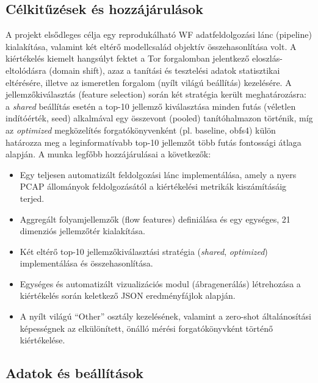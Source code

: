 \documentclass[a4paper,oneside]{article}
\begin{document}
\subsection{Célkitűzések és hozzájárulások}
A projekt elsődleges célja egy reprodukálható WF adatfeldolgozási lánc (pipeline) kialakítása, valamint két eltérő modellcsalád objektív összehasonlítása volt.
A kiértékelés kiemelt hangsúlyt fektet a Tor forgalomban jelentkező eloszlás-eltolódásra (domain shift), azaz a tanítási és tesztelési adatok statisztikai eltérésére, illetve az ismeretlen forgalom (nyílt világú beállítás) kezelésére.
A jellemzőkiválasztás (feature selection) során két stratégia került meghatározásra: a \textit{shared} beállítás esetén a top-10 jellemző kiválasztása minden futás (véletlen indítóérték, seed) alkalmával egy összevont (pooled) tanítóhalmazon történik, míg az \textit{optimized} megközelítés forgatókönyvenként (pl. baseline, obfs4) külön határozza meg a leginformatívabb top-10 jellemzőt több futás fontossági átlaga alapján.
A munka legfőbb hozzájárulásai a következők:
\begin{itemize}
    \item Egy teljesen automatizált feldolgozási lánc implementálása, amely a nyers PCAP állományok feldolgozásától a kiértékelési metrikák kiszámításáig terjed.
\item Aggregált folyamjellemzők (flow features) definiálása és egy egységes, 21 dimenziós jellemzőtér kialakítása.
\item Két eltérő top-10 jellemzőkiválasztási stratégia (\textit{shared}, \textit{optimized}) implementálása és összehasonlítása.
\item Egységes és automatizált vizualizációs modul (ábragenerálás) létrehozása a kiértékelés során keletkező JSON eredményfájlok alapján.
\item A nyílt világú ``Other'' osztály kezelésének, valamint a zero-shot általánosítási képességnek az elkülönített, önálló mérési forgatókönyvként történő kiértékelése.
\end{itemize}

\subsection{Adatok és beállítások}
\end{document}

